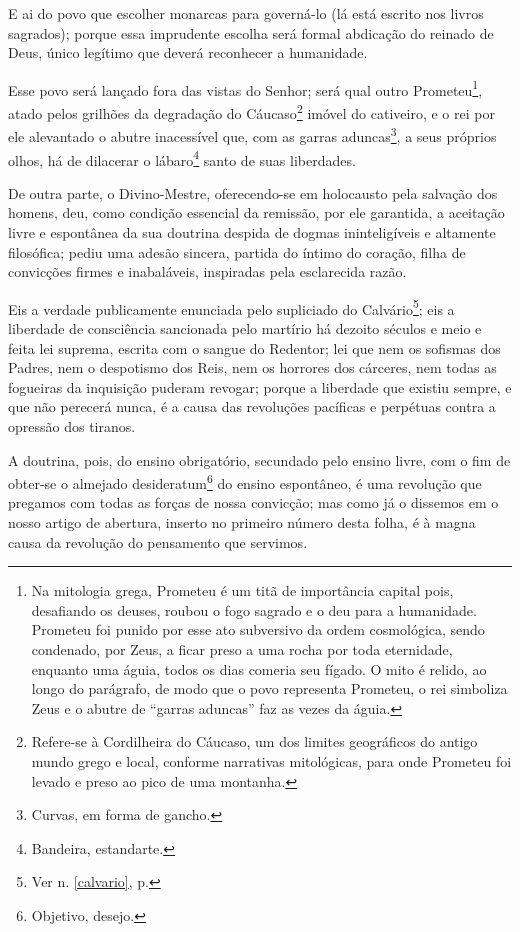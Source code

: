 E ai do povo que escolher monarcas para governá-lo (lá está escrito nos
livros sagrados); porque essa imprudente escolha será formal abdicação
do reinado de Deus, único legítimo que deverá reconhecer a humanidade.

Esse povo será lançado fora das vistas do Senhor; será qual outro
Prometeu\footnote{Na mitologia grega, Prometeu é um titã de
  importância capital pois, desafiando os deuses, roubou o fogo sagrado
  e o deu para a humanidade. Prometeu foi punido por esse ato subversivo
  da ordem cosmológica, sendo condenado, por Zeus, a ficar preso a uma
  rocha por toda eternidade, enquanto uma águia, todos os dias comeria
  seu fígado. O mito é relido, ao longo do parágrafo, de modo que o povo
  representa Prometeu, o rei simboliza Zeus e o abutre de ``garras
  aduncas'' faz as vezes da águia.}, atado pelos grilhões da degradação
do Cáucaso\footnote{Refere-se à Cordilheira do Cáucaso, um dos limites
  geográficos do antigo mundo grego e local, conforme narrativas
  mitológicas, para onde Prometeu foi levado e preso ao pico de uma
  montanha.} imóvel do cativeiro, e o rei por ele alevantado o abutre
inacessível que, com as garras aduncas\footnote{Curvas, em forma de
  gancho.}, a seus próprios olhos, há de dilacerar o lábaro\footnote{
  Bandeira, estandarte.} santo de suas liberdades.

De outra parte, o Divino-Mestre, oferecendo-se em holocausto pela
salvação dos homens, deu, como condição essencial da remissão, por ele
garantida, a aceitação livre e espontânea da sua doutrina despida de
dogmas ininteligíveis e altamente filosófica; pediu uma adesão sincera,
partida do íntimo do coração, filha de convicções firmes e inabaláveis,
inspiradas pela esclarecida razão.

Eis a verdade publicamente enunciada pelo supliciado do
Calvário\footnote{Ver n. \ref{calvario}, p. \pageref{calvario}}; eis a 
liberdade de consciência sancionada pelo martírio
há dezoito séculos e meio e feita lei suprema, escrita com o sangue do
Redentor; lei que nem os sofismas dos Padres, nem o despotismo dos Reis,
nem os horrores dos cárceres, nem todas as fogueiras da inquisição
puderam revogar; porque a liberdade que existiu sempre, e que não
perecerá nunca, é a causa das revoluções pacíficas e perpétuas contra a
opressão dos tiranos.

A doutrina, pois, do ensino obrigatório, secundado pelo ensino livre,
com o fim de obter-se o almejado desideratum\footnote{Objetivo,
  desejo.} do ensino espontâneo, é uma revolução que pregamos com todas
as forças de nossa convicção; mas como já o dissemos em o nosso artigo
de abertura, inserto no primeiro número desta folha, é à magna causa da
revolução do pensamento que servimos.

